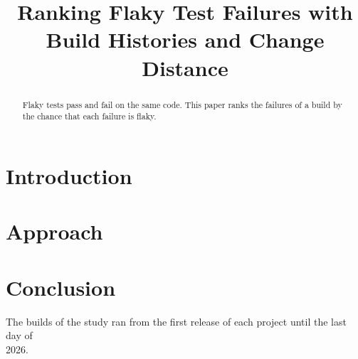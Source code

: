 \documentclass[10pt,conference,letterpaper]{IEEEtran}
\begin{document}
\title{Ranking Flaky Test Failures with\\Build Histories and Change Distance}
\author{}
\maketitle

\begin{abstract}
Flaky tests pass and fail on the same code. This paper ranks the failures of a build by the
chance that each failure is flaky.
\end{abstract}

\section{Introduction}
\lipsum[1-7]

\section{Approach}
\lipsum[8-9]

\section{Conclusion}
\lipsum[14]
The builds of the study ran from the first release of each project until the last day of\\
2026.
\end{document}
